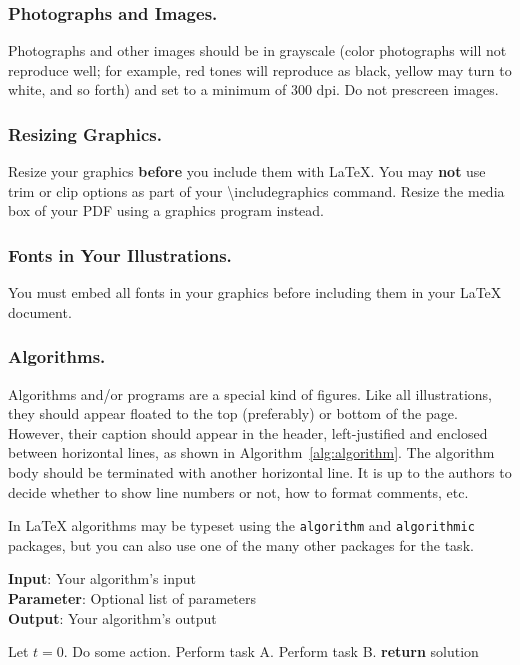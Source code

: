 \subsubsection{Photographs and Images.}
Photographs and other images should be in grayscale (color photographs will not reproduce well; for example, red tones will reproduce as black, yellow may turn to white, and so forth) and set to a minimum of 300 dpi. Do not prescreen images.

\subsubsection{Resizing Graphics.}
Resize your graphics \textbf{before} you include them with LaTeX. You may \textbf{not} use trim or clip options as part of your \textbackslash includegraphics command. Resize the media box of your PDF using a graphics program instead.

\subsubsection{Fonts in Your Illustrations.}
You must embed all fonts in your graphics before including them in your LaTeX document.

\subsubsection{Algorithms.}
Algorithms and/or programs are a special kind of figures. Like all illustrations, they should appear floated to the top (preferably) or bottom of the page. However, their caption should appear in the header, left-justified and enclosed between horizontal lines, as shown in Algorithm~\ref{alg:algorithm}. The algorithm body should be terminated with another horizontal line. It is up to the authors to decide whether to show line numbers or not, how to format comments, etc.

In \LaTeX{} algorithms may be typeset using the {\tt algorithm} and {\tt algorithmic} packages, but you can also use one of the many other packages for the task.

\begin{algorithm}[tb]
\caption{Example algorithm}
\label{alg:algorithm}
\textbf{Input}: Your algorithm's input\\
\textbf{Parameter}: Optional list of parameters\\
\textbf{Output}: Your algorithm's output
\begin{algorithmic}[1] %
\STATE Let $t=0$.
\STATE Do some action.
\STATE Perform task A.
\ELSE
\STATE Perform task B.
\ENDIF
\ENDWHILE
\STATE \textbf{return} solution
\end{algorithmic}
\end{algorithm}

